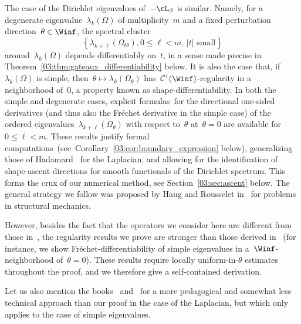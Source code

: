         The case of the Dirichlet eigenvalues of~$-\cL_\beta$ is similar.
        Namely, for a degenerate eigenvalue~$\lambda_k(\Omega)$ of multiplicity~$m$ and a fixed perturbation direction~$\theta\in\Winf$, the spectral cluster
        $$\left\{\lambda_{k+\ell}(\Omega_{t\theta}),0\leq \ell < m,\,|t|\text{ small}\right\}$$
         around~$\lambda_k(\Omega)$ depends differentiably on~$t$, in a sense made precise in Theorem~\ref{03:thm:gateaux_differentiability} below.
        It is also the case that, if~$\lambda_k(\Omega)$ is simple, then~$\theta\mapsto \lambda_k(\Omega_\theta)$ has~$\mathcal C^1(\Winf)$-regularity in a neighborhood of~$0$, a property known as shape-differentiability.
        In both the simple and degenerate cases, explicit formulas~for the directional one-sided derivatives (and thus also the Fréchet derivative in the simple case) of the ordered eigenvalues~$\lambda_{k+\ell}(\Omega_\theta)$ with respect to~$\theta$ at~$\theta=0$ are available for~$0\leq \ell<m$.
        These results justify formal computations~(see~Corollary~\ref{03:cor:boundary_expression} below), generalizing those of Hadamard~\cite{H08} for the Laplacian, and allowing for the identification of shape-ascent directions for smooth functionals of the Dirichlet spectrum. This forms the crux of our numerical method, see Section~\ref{03:sec:ascent} below.
        The general strategy we follow was proposed by Haug and Rousselet in~\cite{HR80a,HR80b,R83,HR83} for problems in structural mechanics.
        
        However, besides the fact that the operators we consider here are different from those in~\cite{R83,HR83}, the regularity results we prove are stronger than those derived in~\cite{HR80a,HR80b,R83,HR83} (for instance, we show Fréchet-differentiability of simple eigenvalues in a~$\Winf$-neighborhood of~$\theta=0$). These results require locally uniform-in-$\theta$ estimates throughout the proof, and we therefore give a self-contained derivation.
        
        Let us also mention the books~\cite[Section 5.7]{HP05} and~\cite[Section 2.5]{H06} for a more pedagogical and somewhat less technical approach than our proof in the case of the Laplacian, but which only applies to the case of simple eigenvalues.

